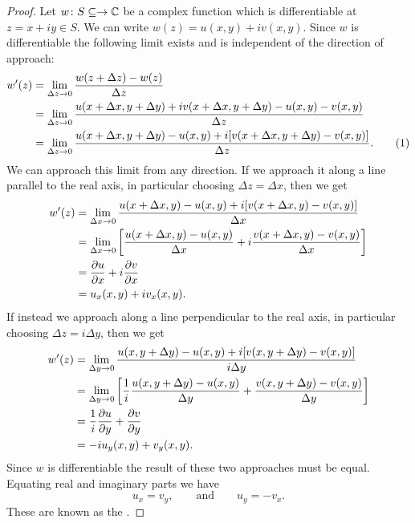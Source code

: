 \documentclass{article}
\begin{document}
    \begin{proof}
        Let \(w\colon S\subseteq\to\mathbb{C}\) be a complex function which is differentiable at \(z = x + iy\in S\).
        We can write \(w(z) = u(x, y) + iv(x, y)\).
        Since \(w\) is differentiable the following limit exists and is independent of the direction of approach:
        \begin{align*}
            w'(z) &= \lim_{\Delta z \to 0} \frac{w(z + \Delta z) - w(z)}{\Delta z}\\
            &= \lim_{\Delta z\to 0} \frac{u(x + \Delta x, y + \Delta y) + iv(x + \Delta x, y + \Delta y) - u(x, y) - v(x, y)}{\Delta z}\\
            &= \lim_{\Delta z\to 0} \frac{u(x + \Delta x, y + \Delta y) - u(x, y) + i[v(x + \Delta x, y + \Delta y) - v(x, y)]}{\Delta z}. \stepcounter{equation}\tag{\theequation}\label{eqn:derivative as lim of u and v}
        \end{align*}
        We can approach this limit from any direction.
        If we approach it along a line parallel to the real axis, in particular choosing \(\Delta z = \Delta x\), then we get
        \begin{align*}
            w'(z) &= \lim_{\Delta x\to 0} \frac{u(x + \Delta x, y) - u(x, y) + i[v(x + \Delta x, y) - v(x, y)]}{\Delta x} \\
            &= \lim_{\Delta x \to 0} \left[ \frac{u(x + \Delta x, y) - u(x, y)}{\Delta x} + i \frac{v(x + \Delta x, y) - v(x, y)}{\Delta x} \right]\\
            &= \pdv{u}{x} + i\pdv{v}{x}\\
            &= u_x(x, y) + iv_x(x, y).
        \end{align*}
        If instead we approach along a line perpendicular to the real axis, in particular choosing \(\Delta z = i\Delta y\), then we get
        \begin{align*}
            w'(z) &= \lim_{\Delta y \to 0} \frac{u(x, y + \Delta y) - u(x, y) + i[v(x, y + \Delta y) - v(x, y)]}{i\Delta y}\\
            &= \lim_{\Delta y\to 0} \left[ \frac{1}{i}\frac{u(x, y + \Delta y) - u(x, y)}{\Delta y} + \frac{v(x, y + \Delta y) - v(x, y)}{\Delta y} \right]\\
            &= \frac{1}{i}\pdv{u}{y} + \pdv{v}{y}\\
            &= -iu_y(x, y) + v_y(x, y).
        \end{align*}
        Since \(w\) is differentiable the result of these two approaches must be equal.
        Equating real and imaginary parts we have
        \[u_x = v_y, \qquad\text{and}\qquad u_y = -v_x.\]
        These are known as the .
    \end{proof}
\end{document}

